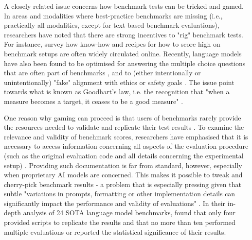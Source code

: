 A closely related issue concerns how benchmark tests can be tricked and gamed. In areas and modalities where best-practice benchmarks are missing (i.e., practically all modalities, except for text-based benchmark evaluations), researchers have noted that there are strong incentives to "rig" benchmark tests. For instance, \citet{dehghani2021} survey how know-how and recipes for how to score high on benchmark setups are often widely circulated online.
Recently, language models have also been found to be optimised for answering the multiple choice questions that are often part of benchmarks \cite{alzahrani2024}, and to (either intentionally or unintentionally) "fake" alignment with ethics or safety goals \cite{greenblatt2024}.
The issue point towards what is known as Goodhart's law, i.e. the recognition that "when a measure becomes a target, it ceases to be a good measure" \cite{strathern1997}.

One reason why gaming can proceed is that users of benchmarks rarely provide the resources needed to validate and replicate their test results \cite{bartz-beielstein2020, dehghani2021, biderman2024, reuel_betterbench_2024}. To examine the relevance and validity of benchmark scores, researchers have emphasised that it is necessary to access information concerning all aspects of the evaluation procedure (such as the original evaluation code and all details concerning the experimental setup) \cite{biderman2024}. Providing such documentation is far from standard, however, especially when proprietary AI models are concerned. This makes it possible to tweak and cherry-pick benchmark results - a problem that is especially pressing given that subtle "variations in prompts, formatting or other implementation details can significantly impact the performance and validity of evaluations" \cite[p.~3]{biderman2024}. In their in-depth analysis of 24 SOTA language model benchmarks, \citet{reuel_betterbench_2024} found that only four provided scripts to replicate the results and that no more than ten performed multiple evaluations or reported the statistical significance of their results. 

